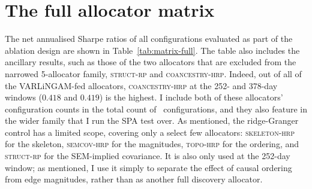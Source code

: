 \documentclass[11pt, a4paper]{report}
\newcommand{\skelhrp}{\textsc{skeleton-hrp}}
\newcommand{\semcovhrp}{\textsc{semcov-hrp}}
\newcommand{\topohrp}{\textsc{topo-hrp}}
\newcommand{\structrp}{\textsc{struct-rp}}
\newcommand{\coanchrp}{\textsc{coancestry-hrp}}
\begin{document}
\section{The full allocator matrix}

The net annualised Sharpe ratios of all configurations evaluated as part of the ablation design are shown in 
Table~\ref{tab:matrix-full}. The table also includes the ancillary results, such as those of the two allocators that are excluded from
the narrowed 5-allocator family, \structrp{} and \coanchrp{}. 
Indeed, out of all of the VARLiNGAM-fed allocators, \coanchrp{} at the 252- and 378-day windows ($0.418$ and $0.419$) is the highest.
I include both of these allocators' configuration counts in the total count of \rsNtrials\ configurations, and they also feature in the wider family that I run the SPA test over.
As mentioned, the ridge-Granger control has a limited scope, covering only a select few allocators: \skelhrp{} for the skeleton, \semcovhrp{} for the magnitudes, \topohrp{} for the ordering, and \structrp{} for the SEM-implied covariance.
It is also only used at the 252-day window; as mentioned, I use it simply to separate the effect of causal ordering from edge magnitudes, rather than as another full discovery allocator.
\end{document}
